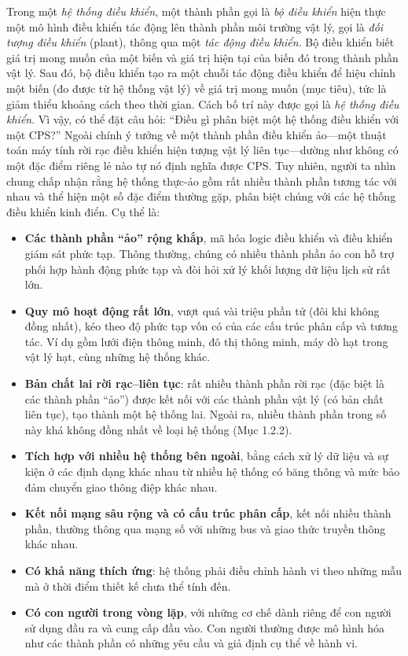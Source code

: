 Trong một \emph{hệ thống điều khiển}, một thành phần gọi là \emph{bộ điều khiển} hiện thực một mô hình điều khiển tác động lên thành phần môi trường vật lý, gọi là \emph{đối tượng điều khiển} (plant), thông qua một \emph{tác động điều khiển}. Bộ điều khiển biết giá trị mong muốn của một biến và giá trị hiện tại của biến đó trong thành phần vật lý. Sau đó, bộ điều khiển tạo ra một chuỗi tác động điều khiển để hiệu chỉnh một biến (đo được từ hệ thống vật lý) về giá trị mong muốn (mục tiêu), tức là giảm thiểu khoảng cách theo thời gian. Cách bố trí này được gọi là \emph{hệ thống điều khiển}. Vì vậy, có thể đặt câu hỏi: ``Điều gì phân biệt một hệ thống điều khiển với một CPS?'' Ngoài chính ý tưởng về một thành phần điều khiển ảo---một thuật toán máy tính rời rạc điều khiển hiện tượng vật lý liên tục---dường như không có một đặc điểm riêng lẻ nào tự nó định nghĩa được CPS. Tuy nhiên, người ta nhìn chung chấp nhận rằng hệ thống thực-ảo gồm rất nhiều thành phần tương tác với nhau và thể hiện một số đặc điểm thường gặp, phân biệt chúng với các hệ thống điều khiển kinh điển. Cụ thể là:
\begin{itemize}
\item \textbf{Các thành phần ``ảo'' rộng khắp}, mã hóa logic điều khiển và điều khiển giám sát phức tạp. Thông thường, chúng có nhiều thành phần ảo con hỗ trợ phối hợp hành động phức tạp và đòi hỏi xử lý khối lượng dữ liệu lịch sử rất lớn.
\item \textbf{Quy mô hoạt động rất lớn}, vượt quá vài triệu phần tử (đôi khi không đồng nhất), kéo theo độ phức tạp vốn có của các cấu trúc phân cấp và tương tác. Ví dụ gồm lưới điện thông minh, đô thị thông minh, máy dò hạt trong vật lý hạt, cùng những hệ thống khác.
\item \textbf{Bản chất lai rời rạc--liên tục}: rất nhiều thành phần rời rạc (đặc biệt là các thành phần ``ảo'') được kết nối với các thành phần vật lý (có bản chất liên tục), tạo thành một hệ thống lai. Ngoài ra, nhiều thành phần trong số này khá không đồng nhất về loại hệ thống (Mục 1.2.2).
\item \textbf{Tích hợp với nhiều hệ thống bên ngoài}, bằng cách xử lý dữ liệu và sự kiện ở các định dạng khác nhau từ nhiều hệ thống có băng thông và mức bảo đảm chuyển giao thông điệp khác nhau.
\item \textbf{Kết nối mạng sâu rộng và có cấu trúc phân cấp}, kết nối nhiều thành phần, thường thông qua mạng số với những bus và giao thức truyền thông khác nhau.
\item \textbf{Có khả năng thích ứng}: hệ thống phải điều chỉnh hành vi theo những mẫu mà ở thời điểm thiết kế chưa thể tính đến.
\item \textbf{Có con người trong vòng lặp}, với những cơ chế dành riêng để con người sử dụng đầu ra và cung cấp đầu vào. Con người thường được mô hình hóa như các thành phần có những yêu cầu và giả định cụ thể về hành vi.
\end{itemize}

